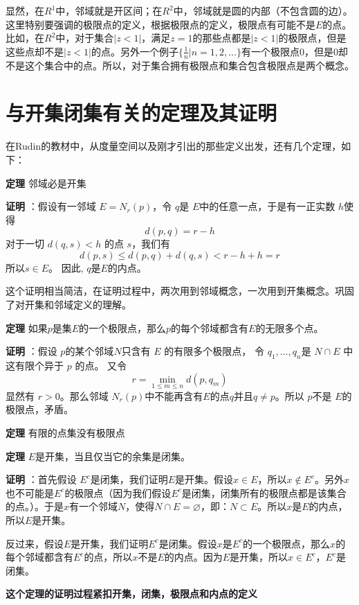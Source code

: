 \documentclass[10pt,a4paper,UTF8]{article}
\begin{document}
显然，在\(R^{1}\)中，邻域就是开区间；在\(R^{2}\)中，邻域就是圆的内部（不包含圆的边）。这里特别要强调的极限点的定义，根据极限点的定义，极限点有可能不是\(E\)的点。比如，在\(R^{2}\)中，对于集合\(|z<1|\)，满足\(z=1\)的那些点都是\(|z<1|\)的极限点，但是这些点却不是\(|z<1|\)的点。另外一个例子\(\{\frac{1}{n}|n=1,2,\ldots\}\)有一个极限点0，但是0却不是这个集合中的点。所以，对于集合拥有极限点和集合包含极限点是两个概念。

\section{与开集闭集有关的定理及其证明}
\label{sec:orgheadline3}


在Rudin的教材中，从度量空间以及刚才引出的那些定义出发，还有几个定理，如下：

\textbf{定理} 邻域必是开集


\textbf{证明} ：假设有一邻域 \(E= N_{r}(p)\)，令 \(q\)是 \(E\)中的任意一点，于是有一正实数 \(h\)使得 \[d(p,q) = r-h\] 对于一切 \(d(q,s) < h\) 的点 \(s\)，我们有 \[ d(p,s) \leq d(p,q) + d(q,s) < r-h + h = r \] 所以\(s\in E\)。 因此, \(q\)是\(E\)的内点。

这个证明相当简洁，在证明过程中，两次用到邻域概念，一次用到开集概念。巩固了对开集和邻域定义的理解。

\textbf{定理} 如果\(p\)是集\(E\)的一个极限点，那么\(p\)的每个邻域都含有\(E\)的无限多个点。

\textbf{证明} ：假设 \(p\)的某个邻域\(N\)只含有 \(E\) 的有限多个极限点， 令 \(q_{1},\ldots, q_{n}\)是 \(N\cap E\) 中这有限个异于 \(p\) 的点。 又令 \[r = \min_{1\leq m \leq n} d(p,q_{m})\] 显然有 \(r>0\)。那么邻域 \(N_{r}(p)\)中不能再含有\(E\)的点\(q\)并且\(q\neq p\)。所以 \(p\)不是 \(E\)的极限点，矛盾。

\textbf{定理} 有限的点集没有极限点

\textbf{定理} \(E\)是开集，当且仅当它的余集是闭集。

\textbf{证明} ：首先假设 \(E^{c}\)是闭集，我们证明\(E\)是开集。假设\(x\in E\)，所以\(x\notin E^{c}\)。另外\(x\)也不可能是\(E^{c}\)的极限点（因为我们假设\(E^{c}\)是闭集，闭集所有的极限点都是该集合的点。）。于是\(x\)有一个邻域\(N\)，使得\(N\cap E=\varnothing\)，即：\(N\subset E\)。所以\(x\)是\(E\)的内点，所以\(E\)是开集。

反过来，假设\(E\)是开集，我们证明\(E^{c}\)是闭集。假设\(x\)是\(E^{c}\)的一个极限点，那么\(x\)的每个邻域都含有\(E^{c}\)的点，所以\(x\)不是\(E\)的内点。因为\(E\)是开集，所以\(x\in E^{c}\)，\(E^{c}\)是闭集。

\textbf{这个定理的证明过程紧扣开集，闭集，极限点和内点的定义}
\end{document}
